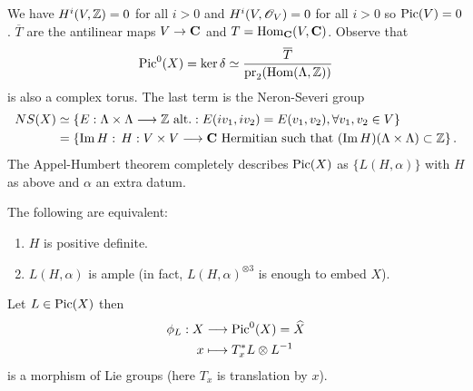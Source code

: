 We have $H^{i}(V,\mathbb Z)=0$ for all $i>0$ and $H^{i}(V,\mathscr{O}_V)=0$ for all $i>0$ so $\operatorname{Pic}(V)=0$. $\overline{T}$ are the antilinear maps $V\to \bb{C}$ and $T=\operatorname{Hom}_{\mathbf{C}}(V,\mathbf{C})$. Observe that
\[
\operatorname{Pic}^{0}(X) = \ker\delta \simeq \frac{\overline{T}}{\operatorname{pr}_2(\operatorname{Hom}(\Lambda,\mathbb Z))}
\]
is also a complex torus. The last term is the Neron-Severi group
\begin{align*}
	NS(X) &\simeq \{E:\Lambda\times \Lambda\to \Z\text{ alt.}: E(iv_1,iv_2)=E(v_1,v_2), \forall v_1,v_2\in V\} \\
	      &= \left\{ \Im H:\, H:V\times V\to \bb{C}\text{ Hermitian such that }(\Im H)(\Lambda\times \Lambda)\subset \Z \right\} 
.\end{align*}
The Appel-Humbert theorem completely describes $\operatorname{Pic}(X)$ as $\{L(H,\alpha)\} $ with $H$ as above and $\alpha$ an extra datum.

\begin{theorem}[Lefschetz]
	The following are equivalent:
	\begin{enumerate}[1)]
		\item $H$ is positive definite.
		\item $L(H,\alpha)$ is ample (in fact, $L(H,\alpha)^{\otimes 3}$ is enough to embed $X$).
	\end{enumerate}
\end{theorem}
Let $L\in \operatorname{Pic}(X)$ then
\begin{align*}
	\phi_L: X &\longrightarrow \operatorname{Pic}^{0}(X) = \widehat{X} \\
	x &\longmapsto T_x^{*}L\otimes L^{-1}
\end{align*}
is a morphism of Lie groups (here $T_x$ is translation by $x$).

